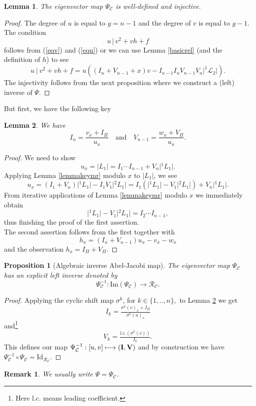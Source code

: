 \documentclass[11pt, a4paper]{amsart}
\newcommand{\eqst}[1]{\begin{equation*}#1\end{equation*}}
\theoremstyle{plain}
\newtheorem{proposition}{Proposition}[section]
\newtheorem{lemma}{Lemma}[section]
\newtheorem{remark}{Remark}[section]
\numberwithin{equation}{section}
\begin{document}
\begin{lemma} The eigenvector map $\Psi_\mathcal C$ is well-defined and injective.
\end{lemma}
\begin{proof}
The degree of $u$ is equal to $g = n-1$ and the degree of $v$ is equal to $g-1$. The condition \eqst{u \, \vert \, v^2+vh+f} follows from (\ref{eqv}) and (\ref{equ}) or we can use Lemma \ref{basicrel} (and the definition of $h$) to see \eqst{u \ \vert \ v^2+vh+f = u((I_n+V_{n-1}+x) v - I_{n-1}I_nV_{n-1}V_n \vert^{1}\mathcal L _2 \vert).}
The injectivity follows from the next proposition where we construct a (left) inverse of $\Psi$. 
\end{proof}
\noindent But first, we have the following key
\begin{lemma}
\label{invlem}
We have \eqst{I_n = \frac{v_x +I_{\Pi}}{u_x} \ \ \ \text{ and } \ \ \ V_{n-1} = \frac{w_x + V_{\Pi}}{u_x}.}
\end{lemma}
\begin{proof}
We need to show \eqst{u_x = \vert L _ 1 \vert = I_1 \cdots I_{n-1} + V_n \vert {}^1 L_1\vert.} Applying Lemma \ref{lemmakeymr} modulo $x$ to $\vert L _1 \vert$, we see \eqst{u_x = (I_1+V_n) \vert {}^1 L _1\vert - I_1 V_1 \vert {}^2 L _1\vert = I_1(\vert {}^1 L_1 \vert - V_1 \vert {}^2 L_1\vert) + V_n \vert {}^1 L_1\vert.} From iterative applications of Lemma \ref{lemmakeymr} modulo $x$ we immediately obtain \eqst{\vert{}^1L_1\vert - V_1\vert{}^2L_1\vert = I_2 \cdots I_{n-1},} thus finishing the proof of the first assertion. \\
The second assertion follows from the first together with \eqst{h_x = (I_n+V_{n-1}) u_x - v_x - w_x} and the observation $h_x = I_{\Pi}+V_{\Pi}$.
\end{proof}
\begin{proposition}[Algebraic inverse Abel-Jacobi map]
\label{inversepsi}
The eigenvector map $\Psi_\mathcal C$ has an explicit left inverse denoted by \eqst{\Psi^{-1}_\mathcal C : \mathrm{Im}(\Psi_\mathcal C)\longrightarrow \mathcal R_\mathcal C.}
\end{proposition}
\begin{proof}
Applying the cyclic shift map $\sigma^k$, for $k \in \{1,..,n\},$ to Lemma \ref{invlem} we get \eqst{I_{k} = \tfrac{\sigma^k(v)_x+I_{\Pi}}{\sigma^k(u)_x}} and\footnote{Here $\mathrm{l.c.}$ means leading coefficient.} \eqst{V_{k} = \tfrac{\mathrm{l.c.}(\sigma^k(v))}{I_k}.}
This defines our map $\Psi^{-1}_\mathcal C: [u,v] \longmapsto (\bold I,\bold V)$ and by construction we have $\Psi^{-1}_\mathcal C \circ \Psi_\mathcal C = \mathrm{Id}_{\mathcal R_\mathcal C}$. 
\end{proof}
\begin{remark}
We usually write $\Psi = \Psi_\mathcal C$.
\end{remark}
\end{document}
